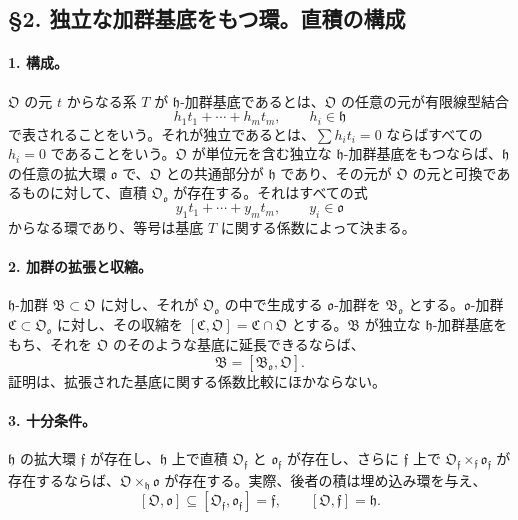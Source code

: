 \subsection*{§2. 独立な加群基底をもつ環。直積の構成}

\paragraph{1. 構成。}
\(\mathfrak O\) の元 \(t\) からなる系 \(T\) が \(\mathfrak h\)-加群基底であるとは、\(\mathfrak O\) の任意の元が有限線型結合
\[
        h_1t_1+\cdots+h_mt_m,
        \qquad h_i\in\mathfrak h
\]
で表されることをいう。それが独立であるとは、\(\sum h_it_i=0\) ならばすべての \(h_i=0\) であることをいう。\(\mathfrak O\) が単位元を含む独立な \(\mathfrak h\)-加群基底をもつならば、\(\mathfrak h\) の任意の拡大環 \(\mathfrak o\) で、\(\mathfrak O\) との共通部分が \(\mathfrak h\) であり、その元が \(\mathfrak O\) の元と可換であるものに対して、直積 \(\mathfrak O_{\mathfrak o}\) が存在する。それはすべての式
\[
        y_1t_1+\cdots+y_mt_m,
        \qquad y_i\in\mathfrak o
\]
からなる環であり、等号は基底 \(T\) に関する係数によって決まる。

\paragraph{2. 加群の拡張と収縮。}
\(\mathfrak h\)-加群 \(\mathfrak B\subset\mathfrak O\) に対し、それが \(\mathfrak O_{\mathfrak o}\) の中で生成する \(\mathfrak o\)-加群を \(\mathfrak B_{\mathfrak o}\) とする。\(\mathfrak o\)-加群 \(\mathfrak C\subset\mathfrak O_{\mathfrak o}\) に対し、その収縮を \([\mathfrak C,\mathfrak O]=\mathfrak C\cap\mathfrak O\) とする。\(\mathfrak B\) が独立な \(\mathfrak h\)-加群基底をもち、それを \(\mathfrak O\) のそのような基底に延長できるならば、
\[
        \mathfrak B=[\mathfrak B_{\mathfrak o},\mathfrak O].
\]
証明は、拡張された基底に関する係数比較にほかならない。

\paragraph{3. 十分条件。}
\(\mathfrak h\) の拡大環 \(\mathfrak f\) が存在し、\(\mathfrak h\) 上で直積 \(\mathfrak O_{\mathfrak f}\) と \(\mathfrak o_{\mathfrak f}\) が存在し、さらに \(\mathfrak f\) 上で \(\mathfrak O_{\mathfrak f}\times_{\mathfrak f}\mathfrak o_{\mathfrak f}\) が存在するならば、\(\mathfrak O\times_{\mathfrak h}\mathfrak o\) が存在する。実際、後者の積は埋め込み環を与え、
\[
        [\mathfrak O,\mathfrak o]\subseteq [\mathfrak O_{\mathfrak f},\mathfrak o_{\mathfrak f}]=\mathfrak f,
        \qquad [\mathfrak O,\mathfrak f]=\mathfrak h.
\]

